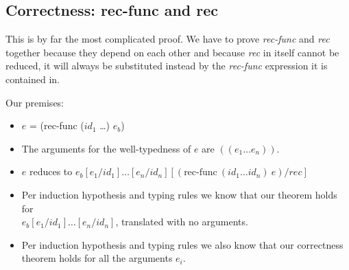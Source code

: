 \documentclass[letterpaper,12pt]{article}
\begin{document}
\subsection{Correctness: rec-func and rec}

This is by far the most complicated proof. We have to prove \textit{rec-func}
and \textit{rec} together because they depend on each other and because
\textit{rec} in itself cannot be reduced, it will always be substituted
instead by the \textit{rec-func} expression it is contained in.

Our premises:
\begin{itemize}
	\item $e$ = (rec-func ($id_1$ \dots) $e_b$)
	\item The arguments for the well-typedness of $e$ are $((e_1 \dots e_n))$.
	\item $e$ reduces to 
		$e_b[e_1 / id_1]\dots[e_n / id_n][(\text{rec-func}\:(id_1 \dots id_n)\:e) / rec]$
	\item Per induction hypothesis and typing rules we know that our theorem
		holds for \\
		$e_b[e_1 / id_1]\dots[e_n / id_n]$, translated with no arguments.
	\item Per induction hypothesis and typing rules we also know that our correctness theorem
		holds for all the arguments $e_i$.
\end{itemize}
\end{document}
